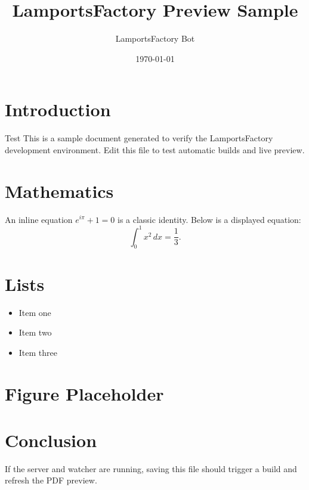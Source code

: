 \documentclass[a4paper]{article}
\title{LamportsFactory Preview Sample}
\author{LamportsFactory Bot}
\date{\today}
\begin{document}
\maketitle

\section{Introduction}
Test This is a sample document generated to verify the LamportsFactory development environment. Edit this file to test automatic builds and live preview.

\section{Mathematics}
An inline equation $e^{i\pi} + 1 = 0$ is a classic identity. Below is a displayed equation:
\begin{equation}
  \int_0^1 x^2\,dx = \frac{1}{3}.
\end{equation}

\section{Lists}
\begin{itemize}
  \item Item one
  \item Item two
  \item Item three
\end{itemize}

\section{Figure Placeholder}

\section{Conclusion}
If the server and watcher are running, saving this file should trigger a build and refresh the PDF preview.
\end{document}
